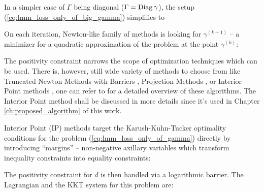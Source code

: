 \documentclass[11pt,letterpaper]{article}
\numberwithin{equation}{section} %
\numberwithin{figure}{section} %
\numberwithin{table}{section} %
\begin{document}
In a simpler case of $\Gamma$ being diagonal ($\Gamma = \operatorname{Diag}{\gamma}$), the setup (\ref{eq:lmm_loss_only_of_big_gamma}) simplifies to

On each iteration, Newton-like family of methods is looking for $\gamma^{(k+1)}$ -- a minimizer for a quadratic approximation of the problem at the point $\gamma^{(k)}$:

The positivity constraint narrows the scope of optimization techniques which can be used. There is, however, still wide variety of methods to choose from like Truncated Newton Methods with Barriers \cite{Nash2000}, Projection Methods \cite{Bertsekas1982}, or Interior Point methods \cite{Potra2000}, one can refer to \cite{TrustRegionBook} for a detailed overview of these algorithms. The Interior Point method shall be discussed in more details since it's used in Chapter \ref{ch:proposed_algorithm} of this work.

Interior Point (IP) methods \cite{Kojima1991, Nesterov1994, Wright1997} target the Karush-Kuhn-Tucker optimality conditions for the problem (\ref{eq:lmm_loss_only_of_gamma}) directly by introducing ``margins'' -- non-negative axillary variables which transform inequality constraints into equality constraints:


The positivity constraint for $d$ is then handled via a logarithmic barrier. The Lagrangian and the KKT system for this problem are:

\end{document}
